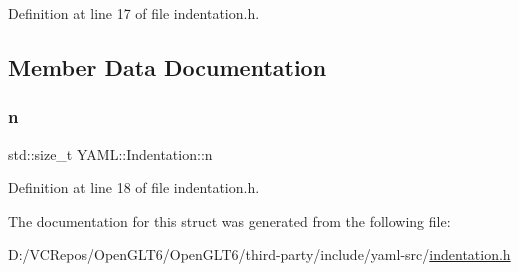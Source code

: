 Definition at line 17 of file indentation.\+h.



\subsection{Member Data Documentation}
\mbox{\label{struct_y_a_m_l_1_1_indentation_ab50d3105b029c1f9302a2ab0f9b8c150}} 
\subsubsection{\texorpdfstring{n}{n}}
{\footnotesize\ttfamily std\+::size\+\_\+t Y\+A\+M\+L\+::\+Indentation\+::n}



Definition at line 18 of file indentation.\+h.



The documentation for this struct was generated from the following file\+:\begin{DoxyCompactItemize}
\item 
D\+:/\+V\+C\+Repos/\+Open\+G\+L\+T6/\+Open\+G\+L\+T6/third-\/party/include/yaml-\/src/\mbox{\hyperlink{indentation_8h}{indentation.\+h}}\end{DoxyCompactItemize}
